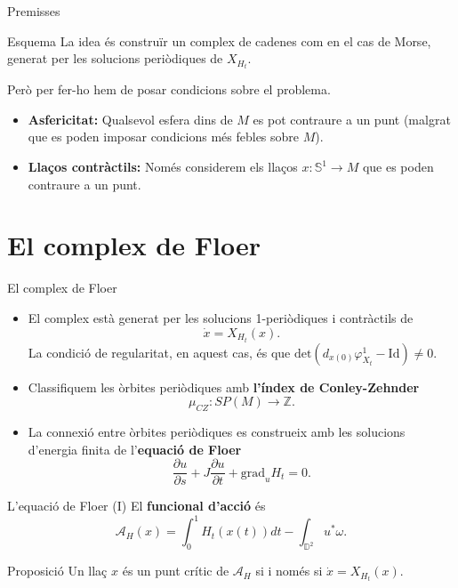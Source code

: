 \documentclass{beamer}
\newcommand{\con}[1]{\mathbb{#1}}
\begin{document}
\begin{frame}{Premisses}
	\begin{block}{Esquema}
		La idea és construïr un complex de cadenes com en el cas de Morse, generat per les solucions periòdiques de $X_{H_t}$.

		Però per fer-ho hem de posar condicions sobre el problema.
	\end{block}

	\begin{itemize}
		\item {\bf Asfericitat:} Qualsevol esfera dins de $M$ es pot contraure a un punt (malgrat que es poden imposar condicions més febles sobre $M$).
		\item {\bf Llaços contràctils:} Només considerem els llaços $x : \con{S}^1 \rightarrow M$ que es poden contraure a un punt.
	\end{itemize}
\end{frame}

\section{El complex de Floer}

\begin{frame}{El complex de Floer}
	\begin{itemize}
		\item El complex està generat per les solucions 1-periòdiques i contràctils de
		\[\dot{x} = X_{H_t}(x) .\]
		La condició de regularitat, en aquest cas, és que $\mathrm{det}(d_{x(0)}\varphi_{X_t}^1 - \mathrm{Id}) \neq 0$.
		\item Classifiquem les òrbites periòdiques amb {\bf l'índex de Conley-Zehnder}
		\[\mu_{CZ} : SP(M) \longrightarrow \con{Z} .\]
		\item La connexió entre òrbites periòdiques es construeix amb les solucions d'energia finita de l'{\bf equació de Floer}
		\[\frac{\partial u}{\partial s} + J \frac{\partial u}{\partial t} + \mathrm{grad}_uH_t = 0 .\]
	\end{itemize}
\end{frame}

\begin{frame}{L'equació de Floer (I)}
	El {\bf funcional d'acció} és
	\[\mathcal{A}_H(x) = \int_0^1 H_t(x(t)) dt - \int_{\con{D}^2} u^{\ast} \omega .\]

	\begin{block}{Proposició}
		Un llaç $x$ és un punt crític de $\mathcal{A}_H$ si i només si $\dot{x} = X_{H_t}(x)$.
	\end{block}
\end{frame}
\end{document}
